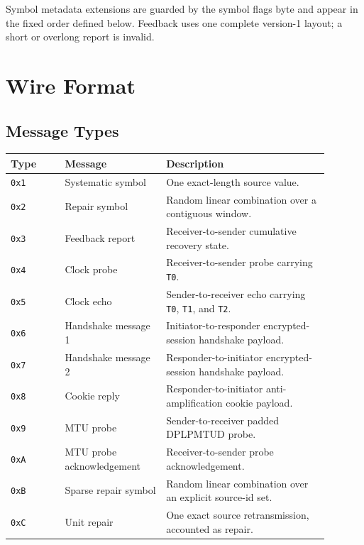 \documentclass[11pt]{article}
\newcommand{\code}[1]{\ifmmode\text{\texttt{#1}}\else\texttt{#1}\fi}
\newcommand{\field}[1]{\code{#1}}
\begin{document}
Symbol metadata extensions are guarded by the symbol flags byte and appear in
the fixed order defined below. Feedback uses one complete version-1 layout; a
short or overlong report is invalid.

\section{Wire Format}
\label{sec:wire-format}

\subsection{Message Types}

\begin{longtable}{>{\raggedright\arraybackslash}p{0.15\linewidth}
                  >{\raggedright\arraybackslash}p{0.29\linewidth}
                  >{\raggedright\arraybackslash}p{0.45\linewidth}}
\toprule
Type & Message & Description \\
\midrule
\endhead
\code{0x1} & Systematic symbol & One exact-length source value. \\
\code{0x2} & Repair symbol & Random linear combination over a contiguous window. \\
\code{0x3} & Feedback report & Receiver-to-sender cumulative recovery state. \\
\code{0x4} & Clock probe & Receiver-to-sender probe carrying \field{T0}. \\
\code{0x5} & Clock echo & Sender-to-receiver echo carrying \field{T0}, \field{T1}, and \field{T2}. \\
\code{0x6} & Handshake message 1 & Initiator-to-responder encrypted-session handshake payload. \\
\code{0x7} & Handshake message 2 & Responder-to-initiator encrypted-session handshake payload. \\
\code{0x8} & Cookie reply & Responder-to-initiator anti-amplification cookie payload. \\
\code{0x9} & MTU probe & Sender-to-receiver padded DPLPMTUD probe. \\
\code{0xA} & MTU probe acknowledgement & Receiver-to-sender probe acknowledgement. \\
\code{0xB} & Sparse repair symbol & Random linear combination over an explicit source-id set. \\
\code{0xC} & Unit repair & One exact source retransmission, accounted as repair. \\
\bottomrule
\end{longtable}
\end{document}
